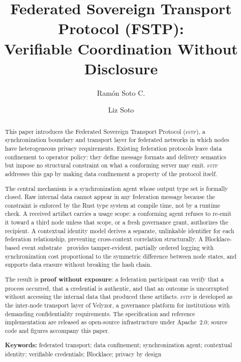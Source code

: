 \documentclass[12pt]{article}
\title{
	\textbf{Federated Sovereign Transport Protocol (FSTP):}\\
	\textbf{Verifiable Coordination Without Disclosure}
}
\author[1]{Ram\'on Soto C.}
\author[2]{Liz Soto}
\affil[1]{Department of Accounting, University of Sonora,
          Hermosillo, Sonora, Mexico \\ \nolinkurl{ramon.soto@unison.mx}}
\affil[2]{Department of Mathematics, University of Sonora,
	Hermosillo, Sonora, Mexico}
\date{}
\newcommand{\FSTP}{\textsc{fstp}}
\begin{document}
	\maketitle
	
	\begin{abstract}
		This paper introduces the Federated Sovereign Transport Protocol (\FSTP{}),
		a synchronization boundary and transport layer for federated networks
		in which nodes have heterogeneous privacy requirements. Existing
		federation protocols leave data confinement to operator policy: they
		define message formats and delivery semantics but impose no structural
		constraint on what a conforming server may emit. \FSTP{} addresses this
		gap by making data confinement a property of the protocol itself.
		
		The central mechanism is a synchronization agent whose output type set
		is formally closed. Raw internal data cannot appear in any federation
		message because the constraint is enforced by the Rust type system at
		compile time, not by a runtime check. A received artifact carries a
		usage scope: a conforming agent refuses to re-emit it toward a third
		node unless that scope, or a fresh governance grant, authorizes the
		recipient. A contextual identity model
		derives a separate, unlinkable identifier for each federation
		relationship, preventing cross-context correlation structurally. A
		Blocklace-based event substrate~\cite{shapiro2023grassroots,keidar2023cordial}
		provides tamper-evident, partially ordered logging with synchronization
		cost proportional to the symmetric difference between node states,
		and supports data erasure without breaking the hash chain.
		
		The result is \textbf{proof without exposure}: a federation participant
		can verify that a process occurred, that a credential is authentic, and
		that an outcome is uncorrupted without accessing the internal data that
		produced these artifacts. \FSTP{} is developed as the inter-node
		transport layer of Velyzor, a governance platform for institutions with
		demanding confidentiality requirements. The specification and reference
		implementation are released as open-source infrastructure under
		Apache~2.0; source code and figures accompany this paper.
		
		\noindent\textbf{Keywords:} federated transport; data confinement;
		synchronization agent; contextual identity; verifiable credentials;
		Blocklace; privacy by design
	\end{abstract}
	
\end{document}
